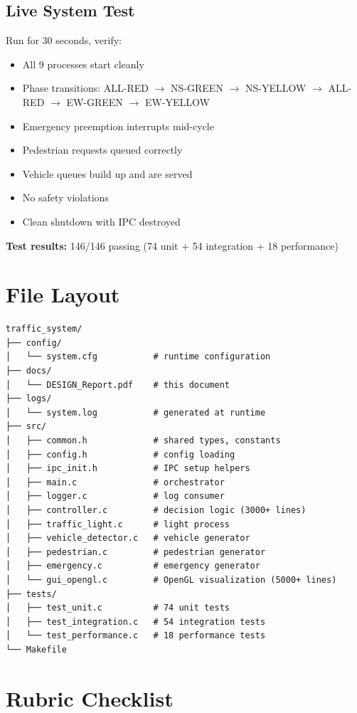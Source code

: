 \documentclass[11pt,a4paper]{article}
\begin{document}
\subsection{Live System Test}
Run for 30 seconds, verify:
\begin{itemize}[noitemsep]
    \item All 9 processes start cleanly
    \item Phase transitions: ALL-RED $\rightarrow$ NS-GREEN $\rightarrow$ NS-YELLOW $\rightarrow$ ALL-RED $\rightarrow$ EW-GREEN $\rightarrow$ EW-YELLOW
    \item Emergency preemption interrupts mid-cycle
    \item Pedestrian requests queued correctly
    \item Vehicle queues build up and are served
    \item No safety violations
    \item Clean shutdown with IPC destroyed
\end{itemize}

\textbf{Test results:} 146/146 passing (74 unit + 54 integration + 18 performance)

\newpage
\section{File Layout}

\begin{verbatim}
traffic_system/
├── config/
│   └── system.cfg           # runtime configuration
├── docs/
│   └── DESIGN_Report.pdf    # this document
├── logs/
│   └── system.log           # generated at runtime
├── src/
│   ├── common.h             # shared types, constants
│   ├── config.h             # config loading
│   ├── ipc_init.h           # IPC setup helpers
│   ├── main.c               # orchestrator
│   ├── logger.c             # log consumer
│   ├── controller.c         # decision logic (3000+ lines)
│   ├── traffic_light.c      # light process
│   ├── vehicle_detector.c   # vehicle generator
│   ├── pedestrian.c         # pedestrian generator
│   ├── emergency.c          # emergency generator
│   └── gui_opengl.c         # OpenGL visualization (5000+ lines)
├── tests/
│   ├── test_unit.c          # 74 unit tests
│   ├── test_integration.c   # 54 integration tests
│   └── test_performance.c   # 18 performance tests
└── Makefile
\end{verbatim}

\newpage
\section{Rubric Checklist}
\end{document}
